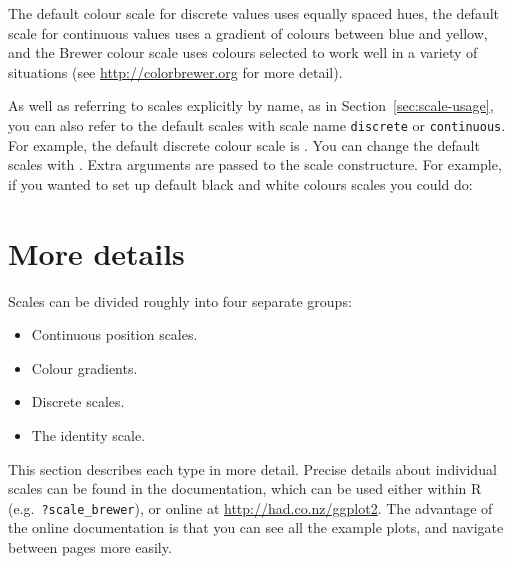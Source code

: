 The default colour scale for discrete values uses equally spaced hues, the default scale for continuous values uses a gradient of colours between blue and yellow, and the Brewer colour scale uses colours selected to work well in a variety of situations (see \url{http://colorbrewer.org} for more detail).

As well as referring to scales explicitly by name, as in Section~\ref{sec:scale-usage}, you can also refer to the default scales with  scale name {\tt discrete} or {\tt continuous}.  For example, the default discrete colour scale is .  You can change the default scales with .  Extra arguments are passed to the scale constructure.  For example, if you wanted to set up default black and white colours scales you could do:

% 



\section{More details}
\label{sec:more-details}

Scales can be divided roughly into four separate groups:

\begin{itemize}
  \item Continuous position scales.
  \item Colour gradients.
  \item Discrete scales.
  \item The identity scale.
\end{itemize}

\noindent  This section describes each type in more detail.  Precise details about individual scales can be found in the documentation, which can be used either within R (e.g.\ {\tt ?scale\_brewer}), or online at  \url{http://had.co.nz/ggplot2}.  The advantage of the online documentation is that you can see all the example plots, and navigate between pages more easily.


